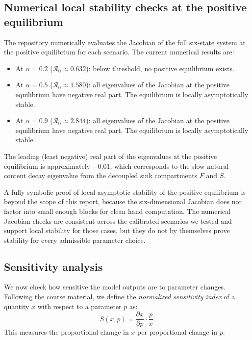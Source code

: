 \documentclass[11pt]{article}
\begin{document}
\subsection{Numerical local stability checks at the positive equilibrium}

The repository numerically evaluates the Jacobian of the full six-state system at the positive equilibrium for each scenario. The current numerical results are:
\begin{itemize}[leftmargin=1.5em]
    \item At $\alpha = 0.2$ ($\mathcal{R}_0 \approx 0.632$): below threshold, no positive equilibrium exists.
    \item At $\alpha = 0.5$ ($\mathcal{R}_0 \approx 1.580$): all eigenvalues of the Jacobian at the positive equilibrium have negative real part. The equilibrium is locally asymptotically stable.
    \item At $\alpha = 0.9$ ($\mathcal{R}_0 \approx 2.844$): all eigenvalues of the Jacobian at the positive equilibrium have negative real part. The equilibrium is locally asymptotically stable.
\end{itemize}
The leading (least negative) real part of the eigenvalues at the positive equilibrium is approximately $-0.01$, which corresponds to the slow natural content decay eigenvalue from the decoupled sink compartments $F$ and $S$.

A fully symbolic proof of local asymptotic stability of the positive equilibrium is beyond the scope of this report, because the six-dimensional Jacobian does not factor into small enough blocks for clean hand computation. The numerical Jacobian checks are consistent across the calibrated scenarios we tested and support local stability for those cases, but they do not by themselves prove stability for every admissible parameter choice.

\subsection{Sensitivity analysis}
\label{sec:sensitivity}

We now check how sensitive the model outputs are to parameter changes. Following the course material, we define the \emph{normalized sensitivity index} of a quantity $x$ with respect to a parameter $p$ as:
\begin{equation}
S(x, p) = \frac{\partial x}{\partial p} \cdot \frac{p}{x}.
\label{eq:sensitivity}
\end{equation}
This measures the proportional change in $x$ per proportional change in $p$.
\end{document}
